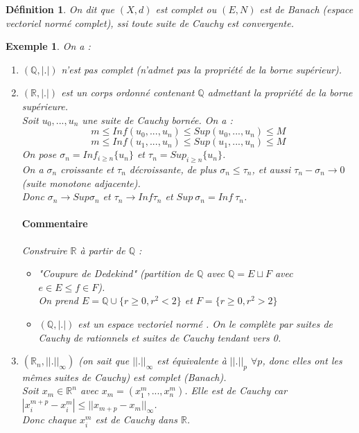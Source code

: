 \documentclass[a4paper, oneside]{report}
\theoremstyle{break}
\newtheorem{defi}[thm]{Définition}
\newtheorem{exem}[thm]{Exemple}
\newcommand{\R}{\mathbb{R}}
\newcommand{\Q}{\mathbb{Q}}
\newcommand{\evn}{espace vectoriel normé }
\begin{document}
\begin{defi}
On dit que $(X,d)$ est complet ou $(E,N)$ est de Banach (espace vectoriel normé complet), ssi toute suite de Cauchy est convergente.
\end{defi}

\begin{exem}

On a :
\begin{enumerate}
\item $(\Q, |.|)$ n'est pas complet (n'admet pas la propriété de la borne supérieur).
\item $(\R, |.|)$ est un corps ordonné contenant $\Q$ admettant la propriété de la borne supérieure.\\
Soit $u_0,...,u_n$ une suite de Cauchy bornée. On a :
$$m\leq Inf(u_0,...,u_n)\leq Sup(u_0,...,u_n)\leq M$$
$$m\leq Inf(u_1,...,u_n)\leq Sup(u_1,...,u_n)\leq M$$
On pose $\sigma_n=Inf_{i\geq n}\{u_n\}$ et $\tau_n=Sup_{i\geq n}\{u_n\}$.\\
On a $\sigma_n$ croissante et $\tau_n$ décroissante, de plus $\sigma_n \leq \tau_n$, et aussi $\tau_n - \sigma_n \rightarrow 0$ (suite monotone adjacente).\\
Donc $\sigma_n \rightarrow Sup\sigma_n$ et $\tau_n \rightarrow Inf \tau_n$ et $Sup~\sigma_n = Inf~\tau_n$.

\paragraph{Commentaire}
Construire $\R$ à partir de $\Q$ :
\begin{itemize}
\item "Coupure de Dedekind" (partition de $\Q$ avec $\Q=E\sqcup F$ avec $e\in E \leq f\in F$).\\
On prend $E=\Q \cup \{r\geq 0, r^2<2 \}$ et $F=\{r\geq 0, r^2>2 \}$

\item $(\Q, |.|)$ est un \evn. On le complète par {suites de Cauchy de rationnels} et {suites de Cauchy tendant vers 0}.
\end{itemize}

\item $(\R_n, ||.||_\infty)$ (on sait que $||.||_\infty$ est équivalente à $||.||_p$ $\forall p$, donc elles ont les mêmes suites de Cauchy) est complet (Banach).\\
Soit $x_m \in \R^n$ avec $x_m=(x_1^m,...,x_n^m)$. Elle est de Cauchy car $|x_i^{m+p}-x_i^m| \leq ||x_{m+p}-x_m||_\infty$.\\
Donc chaque $x_i^m$ est de Cauchy dans $\R$.


\end{enumerate}
\end{exem}
\end{document}
